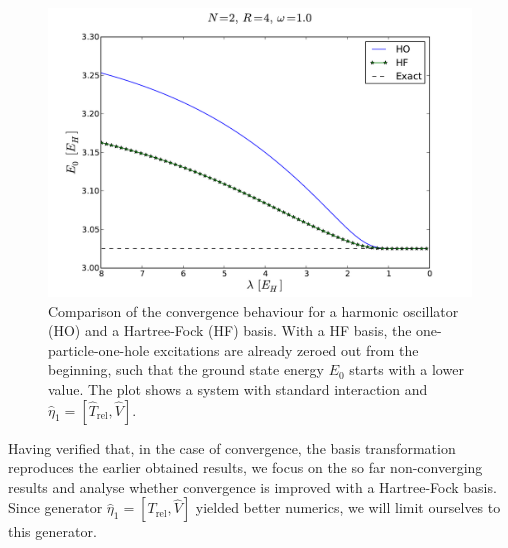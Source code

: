 \begin{figure}
\begin{center}
\includegraphics[scale=0.4]{../Plots/HOHF.pdf}
\end{center}
\caption{Comparison of the convergence behaviour for a harmonic oscillator (HO) and a Hartree-Fock (HF) basis. With a HF basis, the one-particle-one-hole excitations are already zeroed out from the beginning, such that the ground state energy $E_0$ starts with a lower value. The plot shows a system with standard interaction and $\hat{\eta}_1 = \left[ \hat{T}_{\text{rel}}, \hat{V}\right]$. }
\label{fig:HOHF}
\end{figure}


Having verified that, in the case of convergence, the basis transformation reproduces the earlier obtained results, we focus on the so far non-converging results and analyse whether convergence is improved with a Hartree-Fock basis. Since generator $\hat{\eta}_1 = \left[ T_{\text{rel}}, \hat{V}\right]$ yielded better numerics, we will limit ourselves to this generator.



